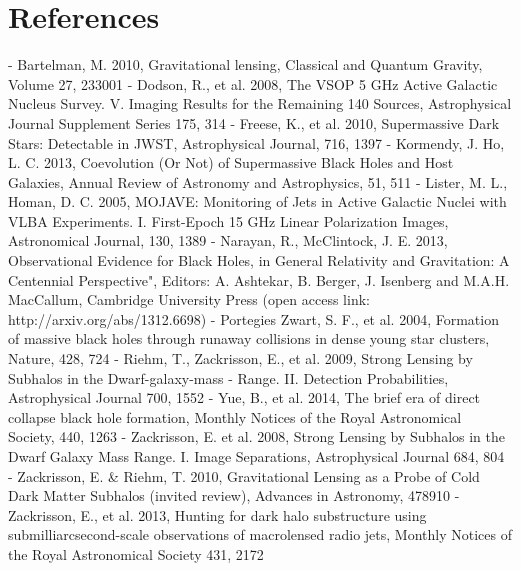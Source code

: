 \documentclass[a4paper, 11pt]{article}
\begin{document}
\section*{References}
- Bartelman, M. 2010, Gravitational lensing, Classical and Quantum Gravity, Volume 27, 233001
- Dodson, R., et al. 2008, The VSOP 5 GHz Active Galactic Nucleus Survey. V. Imaging Results for the Remaining 140 Sources, Astrophysical Journal Supplement Series 175, 314
- Freese, K., et al. 2010, Supermassive Dark Stars: Detectable in JWST, Astrophysical Journal, 716, 1397
- Kormendy, J. Ho, L. C. 2013, Coevolution (Or Not) of Supermassive Black Holes and Host Galaxies, Annual Review of Astronomy and Astrophysics, 51, 511
- Lister, M. L., Homan, D. C. 2005, MOJAVE: Monitoring of Jets in Active Galactic Nuclei with VLBA Experiments. I. First-Epoch 15 GHz Linear Polarization Images, Astronomical Journal, 130, 1389
- Narayan, R., McClintock, J. E. 2013, Observational Evidence for Black Holes, in General Relativity and Gravitation: A Centennial Perspective", Editors: A. Ashtekar, B. Berger, J. Isenberg and M.A.H. MacCallum, Cambridge University Press (open access link: http://arxiv.org/abs/1312.6698)
- Portegies Zwart, S. F., et al. 2004, Formation of massive black holes through runaway collisions in dense young star clusters, Nature, 428, 724
- Riehm, T., Zackrisson, E., et al. 2009, Strong Lensing by Subhalos in the Dwarf-galaxy-mass
- Range. II. Detection Probabilities, Astrophysical Journal 700, 1552
- Yue, B., et al. 2014, The brief era of direct collapse black hole formation, Monthly Notices of the Royal Astronomical Society, 440, 1263
- Zackrisson, E. et al. 2008, Strong Lensing by Subhalos in the Dwarf Galaxy Mass Range. I. Image Separations, Astrophysical Journal 684, 804
- Zackrisson, E. \& Riehm, T. 2010, Gravitational Lensing as a Probe of Cold Dark Matter Subhalos (invited review), Advances in Astronomy, 478910
- Zackrisson, E., et al. 2013, Hunting for dark halo substructure using submilliarcsecond-scale observations of macrolensed radio jets, Monthly Notices of the Royal Astronomical Society 431, 2172
\end{document}
